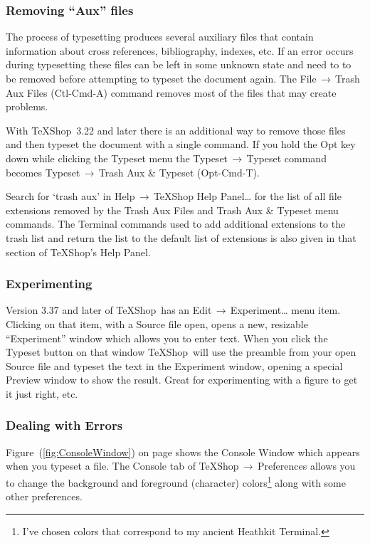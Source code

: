 \documentclass[letterpaper,11pt]{article}
\newcommand{\TS}{\textsf{\TeX Shop}}
\newcommand{\cmd}[1]{\textsf{#1}}
\newcommand{\mnu}[1]{\textsf{#1}}
\newcommand{\To}{\,\(\to\)\,}
\begin{document}
\subsubsection{Removing ``\cmd{Aux}'' files}

The process of typesetting produces several auxiliary files that contain information about cross references, bibliography, indexes, etc. If an error occurs during typesetting these files can be left in some unknown state and need to to be removed before attempting to typeset the document again. The \mnu{File}\To\mnu{Trash Aux Files} (\cmd{Ctl-Cmd-A}) command removes most of the files that may create problems.

With \TS\ 3.22 and later there is an additional way to remove those files and then typeset the document with a single command. If you hold the \cmd{Opt} key down while clicking the \mnu{Typeset} menu the \mnu{Typeset}\To\mnu{Typeset} command becomes \mnu{Typeset}\To\mnu{Trash Aux \& Typeset} (\cmd{Opt-Cmd-T}).

Search for `\cmd{trash aux}' in \mnu{Help}\To\mnu{TeXShop Help Panel…} for the list of all file extensions removed by the \mnu{Trash Aux Files} and \mnu{Trash Aux \& Typeset} menu commands. The \cmd{Terminal} commands used to add additional extensions to the trash list and return the list to the default list of extensions is also given in that section of \TS's Help Panel.

\subsubsection{Experimenting}

Version 3.37 and later of \TS\ has an \mnu{Edit}\To\mnu{Experiment…} menu item. Clicking on that item, with a Source file open, opens a new, resizable ``Experiment'' window which allows you to enter text. When you click the \mnu{Typeset} button on that window \TS\ will use the preamble from your open Source file and typeset the text in the Experiment window, opening a special Preview window to show the result. Great for experimenting with a figure to get it just right, etc.

\subsubsection{Dealing with Errors}

Figure~(\ref{fig:ConsoleWindow}) on page \pageref{fig:ConsoleWindow} shows the \cmd{Console} Window which appears when you typeset a file. The \cmd{Console} tab of \mnu{TeXShop}\To\mnu{Preferences} allows you to change the background and foreground (character) colors\footnote{I've chosen colors that correspond to my ancient Heathkit Terminal.} along with some other preferences.
\end{document}
